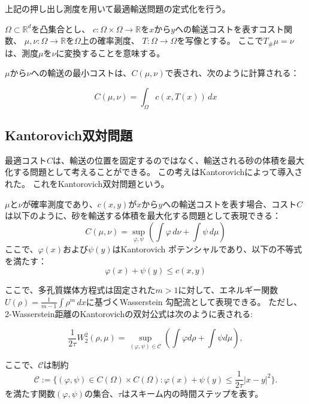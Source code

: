 上記の押し出し測度を用いて最適輸送問題の定式化を行う。

\begin{monge}
    $\Omega \subset \mathbb{R}^d$を凸集合とし、
    $c : \Omega \times \Omega \to \mathbb{R}$を$x$から$y$への輸送コストを表すコスト関数、
    $\mu, \nu : \Omega \to \mathbb{R}$を$\Omega$上の確率測度、
    $T : \Omega \to \Omega$を写像とする。
    ここで$T_\#\mu = \nu$は、測度$\mu$を$\nu$に変換することを意味する。

    $\mu$から$\nu$への輸送の最小コストは、$C(\mu, \nu)$で表され、次のように計算される：

    \[
    C(\mu, \nu) = \int_{\Omega} c(x, T(x)) \,dx
    \]
\end{monge}

\subsection{Kantorovich双対問題}
\label{sect:Kantorovich双対問題}
最適コスト$C$は、輸送の位置を固定するのではなく、輸送される砂の体積を最大化する問題として考えることができる。
この考えはKantorovichによって導入された。\cite{MR0096552}
これをKantorovich双対問題という。


\begin{Kantorovich}
$\mu$と$\nu$が確率測度であり、$c(x, y)$が$x$から$y$への輸送コストを表す場合、コスト$C$は以下のように、砂を輸送する体積を最大化する問題として表現できる：
\[
    C(\mu, \nu) = \sup_{\varphi, \psi} \left( \int \varphi \,d\nu + \int \psi \,d\mu \right)
\]
ここで、$\varphi(x)$および$\psi(y)$はKantorovich ポテンシャルであり、以下の不等式を満たす：
\[
    \varphi(x) + \psi(y) \leq c(x, y)
\]
\end{Kantorovich}
{\color{red}
ここで、多孔質媒体方程式は固定された$m > 1$に対して、エネルギー関数$U(\rho) = \frac{1}{m - 1} \int \rho^m \, dx$に基づくWasserstein 勾配流として表現できる。
ただし、2-Wasserstein距離のKantorovichの双対公式は次のように表される:

\begin{equation}
    \label{eq:wasserstein dual}
    \frac{1}{2\tau} W_2^2(\rho, \mu) = \sup_{(\varphi, \psi) \in \mathcal{C}} \left( \int \varphi d\rho + \int \psi d\mu \right),
\end{equation}

ここで、$\mathcal{C}$は制約
\[
    \mathcal{C}  := \{(\varphi, \psi) \in C(\Omega) \times C(\Omega) : \varphi(x) + \psi(y) \leq \frac{1}{2 \tau} |x - y|^2 \}. 
\]
を満たす関数$(\varphi, \psi)$の集合、$\tau$はスキーム内の時間ステップを表す。
}



